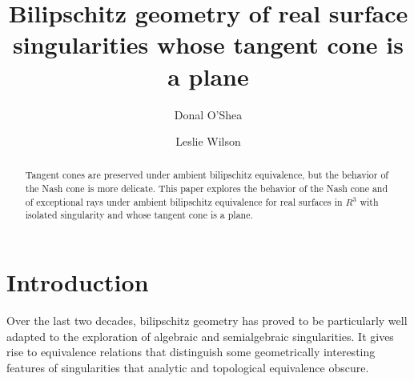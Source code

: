 \documentclass[article]{amsart}
\newcommand{\0}{{\bf 0}}
\begin{document}
 

\title[Bilipschitz geometry of real surface singularities  ]{ Bilipschitz geometry of real surface singularities whose tangent cone is a plane}



\author{Donal O'Shea}

\author{Leslie Wilson}




\address{Donal O'Shea (doshea@ncf.edu): New College of Florida, 5800 Bayshore Road, FL 34243, USA}

\address{Leslie Wilson (les@math.hawaii.edu): Mathematics Department, University of Hawai`i at Manoa, 2565 McCarthy Mall, Honolulu, HI 96822}




\begin{abstract}
Tangent cones are preserved under ambient bilipschitz equivalence, but the behavior of the Nash cone is more delicate.  This paper explores the behavior of the Nash cone and of exceptional rays under ambient bilipschitz equivalence for real surfaces in $R^3$ with isolated singularity and whose tangent cone is a plane.  
\end{abstract}

\maketitle


\section{Introduction}

Over the last two decades, bilipschitz geometry has proved to be particularly well adapted to the exploration of algebraic and semialgebraic singularities.  It gives rise to equivalence relations that 
distinguish some geometrically interesting features of singularities that analytic and topological equivalence obscure. 
\end{document}
